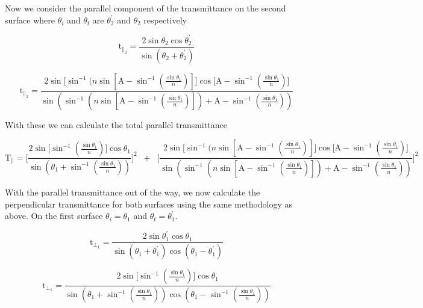 Now we consider the parallel component of the transmittance on the second surface where $\theta_i$ and $\theta_t$ are $\theta^{'}_2$ and $\theta_2$ 
respectively

$$
	\mathrm{t}_{\parallel_2} = 
	\dfrac
	{
		2\sin\theta_2\cos\theta^{'}_2
	}
	{
		\sin(\theta_2 + \theta^{'}_2)
	}
$$

\begin{equation} \label{t-par-2}
	\mathrm{t}_{\parallel_2} = 
	\dfrac
	{
		2\sin\big[ \sin^{-1}(n\sin\left[ \mathrm{A} - \sin^{-1}\left(\frac{\sin\theta_1}{n}\right) \right] \big]
		\cos\big[ \mathrm{A} - \sin^{-1}\left(\frac{\sin\theta_1}{n}\right) \big]
	}
	{
		\sin
		(
			 \sin^{-1}(n\sin\left[ \mathrm{A} - \sin^{-1}\left(\frac{\sin\theta_1}{n}\right)\right]) + 
			 \mathrm{A} - \sin^{-1}\left(\frac{\sin\theta_1}{n}\right)
		)
	}
\end{equation}

With these we can calculate the total parallel transmittance

\begin{equation} \label{T-par}
	\mathrm{T}_\parallel = 
	\Bigg[
	\dfrac
	{
		2\sin\big[\sin^{-1}\left(\frac{\sin\theta_1}{n}\right)\big]\cos\theta_1
	}
	{
		\sin(\theta_1 + \sin^{-1}\left(\frac{\sin\theta_1}{n}\right))
	}
	\Bigg]^2
	\;\;+\;\;
	\Bigg[
	\dfrac
	{
		2\sin\big[ \sin^{-1}(n\sin\left[ \mathrm{A} - \sin^{-1}\left(\frac{\sin\theta_1}{n}\right) \right] \big]
		\cos\big[ \mathrm{A} - \sin^{-1}\left(\frac{\sin\theta_1}{n}\right) \big]
	}
	{
		\sin
		(
			 \sin^{-1}(n\sin\left[ \mathrm{A} - \sin^{-1}\left(\frac{\sin\theta_1}{n}\right)\right]) + 
			 \mathrm{A} - \sin^{-1}\left(\frac{\sin\theta_1}{n}\right)
		)
	}
	\Bigg]^2
\end{equation}

With the parallel transmittance out of the way, we now calculate the perpendicular transmittance for both surfaces using the same methodology as 
above. On the first surface $\theta_i = \theta_1$ and $\theta_t = \theta_1^{'}$.

$$
	\mathrm{t}_{\bot_1} = \dfrac{2\sin\theta_1^{'}\cos\theta_1}{\sin(\theta_1 + \theta_1^{'})\cos(\theta_1 - \theta_1^{'})}
$$

\begin{equation} \label{t-per-1}
	\mathrm{t}_{\bot_1} = 
	\dfrac
	{
		2\sin\big[\sin^{-1}\left(\frac{\sin\theta_1}{n}\right)\big]\cos\theta_1
	}
	{
		\sin(\theta_1 + \sin^{-1}\left(\frac{\sin\theta_1}{n}\right))\cos(\theta_1 - \sin^{-1}\left(\frac{\sin\theta_1}{n}\right))
	}
\end{equation}

